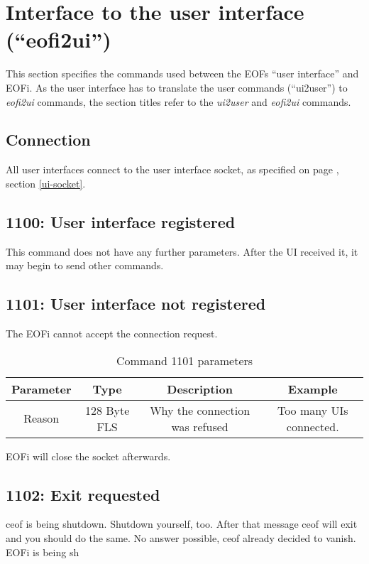 \documentclass[12pt,a4paper]{book}
\begin{document}
\section{Interface to the user interface ("`eofi2ui"')}
This section specifies the commands used between the EOFs
"`user interface"' and EOFi. As the user interface has to translate
the user commands ("`ui2user"') to \emph{eofi2ui} commands, the
section titles refer to the \emph{ui2user} and \emph{eofi2ui} commands.
\subsection{Connection}
All user interfaces connect to the user interface socket, as specified
on page \pageref{ui-socket}, section \ref{ui-socket}.
\subsection{1100: User interface registered}
This command does not have any further parameters.
After the UI received it, it may begin to send other commands.
\subsection{1101: User interface not registered}
The EOFi cannot accept the connection request.
\begin{longtable}{|c|c|c|c|}
\caption{Command 1101 parameters}\\
\hline
\textbf{Parameter} & \textbf{Type} & \textbf{Description} & \textbf{Example}\\
\hline
Reason & 128 Byte FLS & Why the connection was refused & Too many UIs connected.\\
\hline
\end{longtable}
EOFi will close the socket afterwards.
\subsection{1102: Exit requested}
ceof is being shutdown.
Shutdown yourself, too.
After that message ceof will exit and you should do the same.
No answer possible, ceof already decided to vanish.
EOFi is being sh
\end{document}
